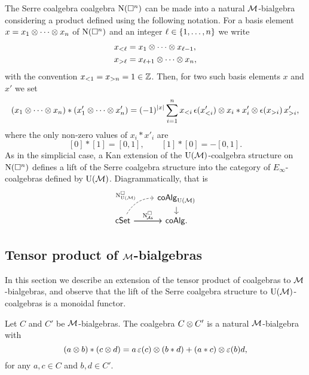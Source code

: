 \begin{example}\label{ex:cubical e-infty}
	The Serre coalgebra coalgebra $\operatorname{N}(\square^n)$ can be made into a natural $\mathcal{M}$-bialgebra considering a product defined using the following notation.
	For a basis element $x = x_1 \otimes \dotsb \otimes x_n$ of $\operatorname{N}(\square^n)$ and an integer $\ell \in \{1,\dots,n\}$ we write
	\begin{align*}
		x_{<\ell} & = x_1 \otimes \dotsb \otimes x_{\ell-1}, \\
		x_{>\ell} & = x_{\ell+1} \otimes \dotsb \otimes x_n,
	\end{align*}
	with the convention $x_{<1} = x_{>n} = 1 \in \mathbb{Z}$.
	Then, for two such basis elements $x$ and $x'$ we set
	\begin{multline*}
		(x_1 \otimes \dotsb \otimes x_n) \ast (x'_1 \otimes \dotsb \otimes x'_n)
		=
		(-1)^{|x|} \sum_{i=1}^n x_{<i}\, \epsilon(x'_{<i}) \otimes x_i \ast x'_i \otimes \epsilon(x_{>i}) \, x'_{>i},
	\end{multline*}
	where the only non-zero values of $x_i \ast x'_i$ are
	\[
	[0] \ast [1] = [0, 1], \qquad [1] \ast [0] = -[0, 1].
	\]
	As in the simplicial case, a Kan extension of the ${\operatorname{U}(\mathcal{M})}$-coalgebra structure on $\operatorname{N}(\square^n)$ defines a lift of the Serre coalgebra structure into the category of $E_\infty$-coalgebras defined by ${\operatorname{U}(\mathcal{M})}$.
	Diagrammatically, that is
	\begin{equation}\label{eq:lift to e-infty cubical}
		\begin{tikzcd}[column sep=normal, row sep=small]
			& \coAlg_{\UM} \arrow[d] \\
			\cSet \arrow[r]
			\arrow[ur,out=60, in=180, dashed, "\cchainsUM"]
			\arrow[r, "\cchainsA"]
			& \coAlg.
		\end{tikzcd}
	\end{equation}
\end{example}

\subsection{Tensor product of $\mathcal{M}$-bialgebras}

In this section we describe an extension of the tensor product of coalgebras to $\mathcal{M}$-bialgebras, and observe that the lift of the Serre coalgebra structure to ${\operatorname{U}(\mathcal{M})}$-coalgebras is a monoidal functor.

\begin{lemma}\label{l:monoidal M-bialg}
	Let $C$ and $C'$ be $\mathcal{M}$-bialgebras.
	The coalgebra $C \otimes C'$ is a natural $\mathcal{M}$-bialgebra with
	\begin{equation}\label{eq:monoidal_product}
		(a \otimes b) \ast (c \otimes d) =
		a \operatorname{\varepsilon}(c) \otimes (b \ast d) + (a \ast c) \otimes \operatorname{\varepsilon}(b) d,
	\end{equation}
	for any $a,c \in C$ and $b,d \in C'$.
\end{lemma}

